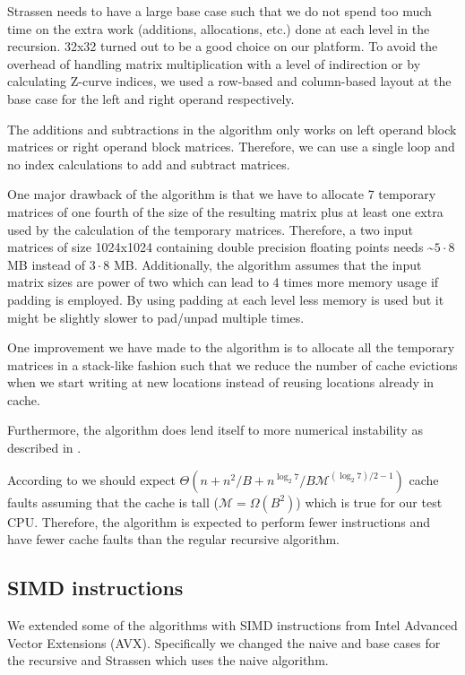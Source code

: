 Strassen needs to have a large base case such that we do not spend too much time on the extra work (additions, allocations, etc.) done at each level in the recursion. 32x32 turned out to be a good choice on our platform. To avoid the overhead of handling matrix multiplication with a level of indirection or by calculating Z-curve indices, we used a row-based and column-based layout at the base case for the left and right operand respectively.

The additions and subtractions in the algorithm only works on left operand block matrices or right operand block matrices. Therefore, we can use a single loop and no index calculations to add and subtract matrices.

One major drawback of the algorithm is that we have to allocate 7 temporary matrices of one fourth of the size of the resulting matrix plus at least one extra used by the calculation of the temporary matrices. Therefore, a two input matrices of size 1024x1024 containing double precision floating points needs \textasciitilde$5\cdot8$ MB instead of $3\cdot8$ MB. Additionally, the algorithm assumes that the input matrix sizes are power of two which can lead to 4 times more memory usage if padding is employed. By using padding at each level less memory is used but it might be slightly slower to pad/unpad multiple times.

One improvement we have made to the algorithm is to allocate all the temporary matrices in a stack-like fashion such that we reduce the number of cache evictions when we start writing at new locations instead of reusing locations already in cache.

Furthermore, the algorithm does lend itself to more numerical instability as described in \citep{Stability}.

According to \cite{Frigo} we should expect $\Theta(n+n^2/B + n^{\log_2 7}/B\mathcal{M}^{(\log_2 7)/2-1})$ cache faults assuming that the cache is tall ($\mathcal{M} = \Omega(B^2)$) which is true for our test CPU. Therefore, the algorithm is expected to perform fewer instructions and have fewer cache faults than the regular recursive algorithm.

\subsection{SIMD instructions}

We extended some of the algorithms with SIMD instructions from Intel Advanced Vector Extensions (AVX). Specifically we changed the naive and base cases for the recursive and Strassen which uses the naive algorithm.

